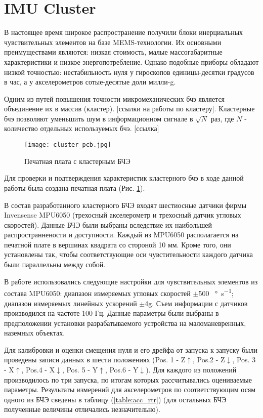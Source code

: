 \section {IMU Cluster}
В настоящее время широкое распространение получили блоки инерциальных чувствительных элементов на базе MEMS-технологии.
Их основными преимуществами являются: низкая стоимость, малые массогабаритные характеристики и низкое энергопотребление.
Однако подобные приборы обладают низкой точностью: нестабильность нуля у гироскопов единицы-десятки градусов в час, а у акселерометров сотые-десятые доли милли-g.

Одним из путей повышения точности микромеханических бчэ является объединение их в массив (кластер). [ссылки на работы по кластеру].
Кластерные бчэ позволяют уменьшить шум в информационном сигнале в $\sqrt{N}$ раз, где $N$ - количество отдельных используемых бчэ. [ссылка]

\newpage

\begin{figure}[h!]
	\centering
	\texttt{[image: cluster\_pcb.jpg]}
	\caption{Печатная плата с кластерным БЧЭ}
	\label{fig:cluster_pcb}
\end{figure}

Для проверки и подтверждения характеристик кластерного бчэ в ходе данной работы была создана печатная плата (Рис. \ref{fig:cluster_pcb}).

В состав разработанного кластерного БЧЭ входят шестиосные датчики фирмы Invensense MPU6050 (трехосный акселерометр и трехосный датчик угловых скоростей).
Данные БЧЭ были выбраны вследствие их наибольшей распространнености и доступности.
Каждый из MPU6050 располагается на печатной плате в вершинах квадрата со стороной 10 мм.
Кроме того, они установлены так, чтобы соответствующие оси чувстительности каждого датчика были параллельны между собой.

В работе использовались следующие настройки для чувствительных элементов из состава MPU6050: диапазон измеряемых угловых скоростей $\pm$500 \SI[per-mode=symbol]{}{\degree\per\second};
диапазон измеряемых линейных ускорений $\pm$4g. Съем информации с датчиков производился на частоте 100 Гц.
Данные параметры были выбраны в предположении установки разрабатываемого устройства на маломаневренных, наземных объектах.

Для калибровки и оценки смещения нуля и его дрейфа от запуска к запуску были проведены записи данных в шести положениях (Pos. 1 - Z$\uparrow$, Pos.2 - Z$\downarrow$,
Pos. 3 - X$\uparrow$, Pos.4 - X$\downarrow$, Pos. 5 - Y$\uparrow$, Pos.6 - Y$\downarrow$). Для каждого из положений производилось по три запуска, по итогам которых рассчитывались
оцениваемые параметры. Результаты измерений для акселерометров по соответствующим осям одного из БЧЭ сведены в таблицу (\ref{table:acc_rtr}) (для остальных БЧЭ полученные величины отличались незначительно).

